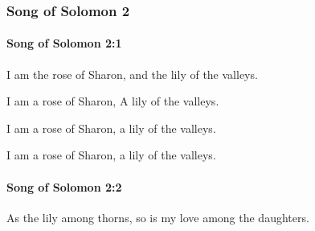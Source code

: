 	\subsubsection{Song of Solomon 2} %
		\label{SONGOFSOLOMON-2}

		\paragraph{Song of Solomon 2:1} %
			\label{SONGOFSOLOMON-2-1}

			I am the rose of Sharon, and the lily of the valleys.

			\begin{versebox}
					\item[BHS] 
					\item[LXX] 
					\item[ASV] I am a rose of Sharon, A lily of the valleys.
					\item[NIV] I am a rose of Sharon, a lily of the valleys.
					\item[NRSV] I am a rose of Sharon, a lily of the valleys.
			\end{versebox}

		\paragraph{Song of Solomon 2:2} %
			\label{SONGOFSOLOMON-2-2}

			As the lily among thorns, so is my love among the daughters.

